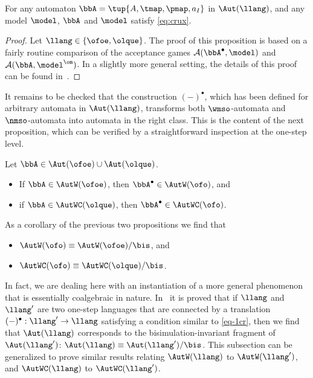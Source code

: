 \begin{proposition}
For any automaton $\bbA = \tup{A,\tmap,\pmap,a_{I}}$ in $\Aut(\llang)$, and any
model $\model$, $\bbA$ and $\model$ satisfy \eqref{eq:crux}.
\end{proposition}

\begin{proof} Let $\llang\in \{{\ofoe},{\olque}\}$.
The proof of this proposition is based on a fairly routine comparison of the 
acceptance games $\mathcal{A}(\bbA^{\bullet},\model)$ and 
$\mathcal{A}(\bbA,\model^{\om})$.
In a slightly more general setting, the details of this proof can be found 
in~\cite{Venxx}.
\end{proof}
\medskip

It remains to be checked that the construction $(-)^{\bullet}$, which has
been defined for arbitrary automata in $\Aut(\llang)$, transforms 
both $\wmso$-automata and $\nmso$-automata into automata in the right class.
This is the content of the next proposition, which can be verified by a 
straightforward inspection at the one-step level.
\begin{proposition}
Let $\bbA \in \Aut(\ofoe)\cup\Aut(\olque)$. 
\begin{itemize}
\item If $\bbA \in \AutW(\ofoe)$, then $\bbA^{\bullet} \in \AutW(\ofo)$, and
\item if $\bbA \in \AutWC(\olque)$, then $\bbA^{\bullet} \in \AutWC(\ofo)$.
\end{itemize}
\end{proposition}


\begin{remark}{\rm
As a corollary of the previous two propositions we find that 
\begin{itemize}
	 pt
	\item $\AutW(\ofo) \equiv \AutW(\ofoe)/{\bis}$, and
	\item $\AutWC(\ofo) \equiv \AutWC(\olque)/{\bis}$.
\end{itemize}
In fact, we are dealing here with an instantiation of a more general phenomenon 
that is essentially coalgebraic in nature.
In~\cite{Venxx} it is proved that if $\llang$ and $\llang'$ are two one-step
languages that are connected by a translation $(-)^{\bullet}: \llang' \to 
\llang$ satisfying a condition similar to \eqref{eq-1cr}, then we find that 
$\Aut(\llang)$ corresponds to the bisimulation-invariant fragment of 
$\Aut(\llang')$: $\Aut(\llang) \equiv \Aut(\llang')/{\bis}$.
This subsection can be generalized to prove similar results relating
$\AutW(\llang)$ to $\AutW(\llang')$, and $\AutWC(\llang)$ to 
$\AutWC(\llang')$.
}\end{remark}
